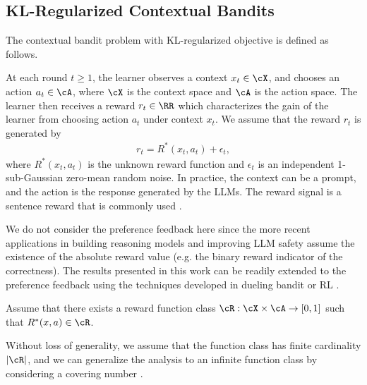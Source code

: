 \documentclass[11pt]{article}
\begin{document}
\subsection{KL-Regularized Contextual Bandits}
The contextual bandit problem with KL-regularized objective is defined as follows. 

At each round $t \ge 1$, the learner observes a context $x_t \in \cX$, and chooses an action $a_t \in \cA$, where $\cX$ is the context space and $\cA$ is the action space. The learner then receives a reward $r_t \in \RR$ which characterizes the gain of the learner from choosing action $a_t$ under context $x_t$. We assume that the reward $r_t$ is generated by \begin{align*} 
    r_t = R^*(x_t, a_t) + \epsilon_t,
\end{align*} where $R^*(x_t, a_t)$ is the unknown reward function and $\epsilon_t$ is an independent 1-sub-Gaussian zero-mean random noise. In practice, the context can be a prompt, and the action is the response generated by the LLMs. The reward signal is a sentence reward that is commonly used \citep{ouyang2022training, bai2022training, touvron2023llama}.

\begin{remark}\label{rmk:preference}
We do not consider the preference feedback here since the more recent applications in building reasoning models \citep{deepseekai2025deepseekr1incentivizingreasoningcapability} and improving LLM safety \citep{guan2024deliberative} assume the existence of the absolute reward value (e.g. the binary reward indicator of the correctness). The results presented in this work can be readily extended to the preference feedback using the techniques developed in dueling bandit or RL \citep{yue2012k, pacchiano2021dueling, xiong2024iterative, li2024feel}.
\end{remark}

\begin{assumption}\label{as:Reward function realizability}
    Assume that there exists a reward function class $\cR: \cX \times \cA\rightarrow [0, 1]$ such that $R^*(x, a) \in \cR$.
\end{assumption}
Without loss of generality, we assume that the function class has finite cardinality $|\cR|$, and we can generalize the analysis to an infinite function class by considering a covering number \citep{zhang2023mathematical}.
\end{document}

